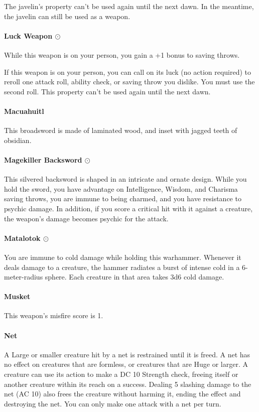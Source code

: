         The javelin's property can't be used again until the next dawn.
        In the meantime, the javelin can still be used as a weapon.
    \paragraph{Luck Weapon $\odot$}
        While this weapon is on your person, you gain a +1 bonus to saving throws.

        If this weapon is on your person, you can call on its luck (no action required) to reroll one attack roll, ability check, or saving throw you dislike.
        You must use the second roll.
        This property can't be used again until the next dawn.
    \paragraph{Macuahuitl}
        This broadsword is made of laminated wood, and inset with jagged teeth of obsidian.
    \paragraph{Magekiller Backsword $\odot$}
        This silvered backsword is shaped in an intricate and ornate design.
        While you hold the sword, you have advantage on Intelligence, Wisdom, and Charisma saving throws, you are immune to being charmed, and you have resistance to psychic damage.
        In addition, if you score a critical hit with it against a creature, the weapon's damage becomes psychic for the attack.
    \paragraph{Matalotok $\odot$}
        You are immune to cold damage while holding this warhammer.
        Whenever it deals damage to a creature, the hammer radiates a burst of intense cold in a 6-meter-radius sphere.
        Each creature in that area takes 3d6 cold damage.
    \paragraph{Musket}
        This weapon's misfire score is 1.
    \paragraph{Net}
        A Large or smaller creature hit by a net is restrained until it is freed.
        A net has no effect on creatures that are formless, or creatures that are Huge or larger.
        A creature can use its action to make a DC 10 Strength check, freeing itself or another creature within its reach on a success.
        Dealing 5 slashing damage to the net (AC 10) also frees the creature without harming it, ending the effect and destroying the net.
        You can only make one attack with a net per turn.
